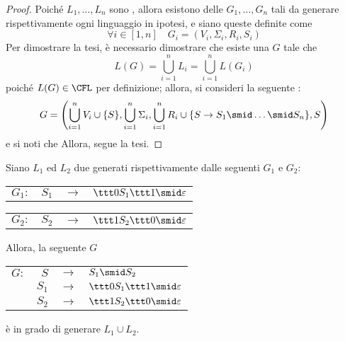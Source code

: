 \documentclass[a4paper, 12pt]{report}
\begin{document}
    \begin{proof}
        Poiché $L_1, \ldots, L_n$ sono \CFL, allora esistono delle \CFG $G_1, \ldots, G_n$ tali da generare rispettivamente ogni linguaggio in ipotesi, e siano queste definite come $$\forall i \in [1, n] \quad G_i = (V_i, \Sigma_i, R_i, S_i)$$ Per dimostrare la tesi, è necessario dimostrare che esiste una \CFG $G$ tale che $$L(G) = \bigcup_{i = 1}^n{L_i} = \bigcup_{i = 1}^n{L(G_i)}$$ poiché $L(G)\in \mathrm{\CFL}$ per definizione; allora, si consideri la seguente \CFG: $$\displaystyle G = \left( \bigcup_{i = 1}^n{V_i} \cup \{S\}, \bigcup_{i = 1}^n{\Sigma_i}, \bigcup_{i = 1}^n{R_i} \cup \{S \rightarrow S_1 \smid \ldots \smid S_n\}, S \right)$$ e si noti che  Allora, segue la tesi.
    \end{proof}

    \begin{example}
        Siano $L_1$ ed $L_2$ due \CFL generati rispettivamente dalle seguenti \CFG $G_1$ e $G_2$:

        \begin{center}
            \begin{tabular}{crcl}
                $G_1:$ & $S_1$ & $\to$ & $\ttt 0 S_1 \ttt 1 \smid \varepsilon$
            \end{tabular}
        \end{center}

        \begin{center}
            \begin{tabular}{crcl}
                $G_2:$ & $S_2$ & $\to$ & $\ttt 1 S_2 \ttt 0 \smid \varepsilon$
            \end{tabular}
        \end{center}

        Allora, la seguente \CFG $G$

        \begin{center}
            \begin{tabular}{crcl}
                $G:$ & $S$   & $\to$ & $S_1 \smid S_2$ \\
                     & $S_1$ & $\to$ & $\ttt 0 S_1 \ttt 1 \smid \varepsilon$ \\
                     & $S_2$ & $\to$ & $\ttt 1 S_2 \ttt 0 \smid \varepsilon$
            \end{tabular}
        \end{center}

        è in grado di generare $L_1 \cup L_2$.
    \end{example}
\end{document}

